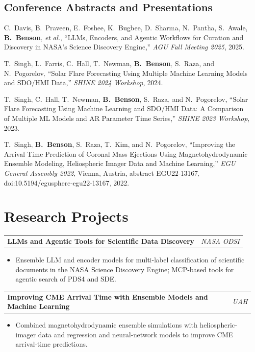 \documentclass[11pt,letterpaper]{article}
\makeatletter
\newcommand{\daterow}[2]{%
  \noindent\begin{tabularx}{\textwidth}{@{}X r@{}}#1 & #2\end{tabularx}\par
}
\newcommand{\me}{\textbf{B.~Benson}}
\makeatother
\begin{document}
\subsection{Conference Abstracts and Presentations}
\begin{pubs}[resume]
  \item C.~Davis, B.~Praveen, E.~Foshee, K.~Bugbee, D.~Sharma, N.~Pantha, S.~Awale, \me, \textit{et al.}, ``LLMs, Encoders, and Agentic Workflows for Curation and Discovery in NASA's Science Discovery Engine,'' \textit{AGU Fall Meeting 2025}, 2025.
  \item T.~Singh, L.~Farris, C.~Hall, T.~Newman, \me, S.~Raza, and N.~Pogorelov, ``Solar Flare Forecasting Using Multiple Machine Learning Models and SDO/HMI Data,'' \textit{SHINE 2024 Workshop}, 2024.
  \item T.~Singh, C.~Hall, T.~Newman, \me, S.~Raza, and N.~Pogorelov, ``Solar Flare Forecasting Using Machine Learning and SDO/HMI Data: A Comparison of Multiple ML Models and AR Parameter Time Series,'' \textit{SHINE 2023 Workshop}, 2023.
  \item T.~Singh, \me, S.~Raza, T.~Kim, and N.~Pogorelov, ``Improving the Arrival Time Prediction of Coronal Mass Ejections Using Magnetohydrodynamic Ensemble Modeling, Heliospheric Imager Data and Machine Learning,'' \textit{EGU General Assembly 2022}, Vienna, Austria, abstract EGU22-13167, doi:10.5194/egusphere-egu22-13167, 2022.
\end{pubs}

\section{Research Projects}

\daterow{\textbf{LLMs and Agentic Tools for Scientific Data Discovery}}{\textit{NASA ODSI}}
\begin{itemize}
  \item Ensemble LLM and encoder models for multi-label classification of scientific documents in the NASA Science Discovery Engine; MCP-based tools for agentic search of PDS4 and SDE.
\end{itemize}

\daterow{\textbf{Improving CME Arrival Time with Ensemble Models and Machine Learning}}{\textit{UAH}}
\begin{itemize}
  \item Combined magnetohydrodynamic ensemble simulations with heliospheric-imager data and regression and neural-network models to improve CME arrival-time predictions.
\end{itemize}
\end{document}
